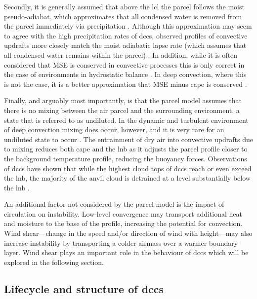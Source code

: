 Secondly, it is generally assumed that above the \acrshort{lcl} the parcel follows the moist pseudo-adiabat, which approximates that all condensed water is removed from the parcel immediately via precipitation \citep{emanuel_atmospheric_1994}. 
Although this approximation may seem to agree with the high precipitation rates of \acrshort{dcc}s, observed profiles of convective updrafts more closely match the moist adiabatic lapse rate (which assumes that all condensed water remains within the parcel) \citep{xu_is_1989}. 
In addition, while it is often considered that MSE is conserved in convective processes this is only correct in the case of environments in hydrostatic balance \citep{peters_evaluating_2021}. 
In deep convection, where this is not the case, it is a better approximation that MSE minus \acrshort{cape} is conserved \citep{romps_mse_2015}.

Finally, and arguably most importantly, is that the parcel model assumes that there is no mixing between the air parcel and the surrounding environment, a state that is referred to as undiluted. 
In the dynamic and turbulent environment of deep convection mixing does occur, however, and it is very rare for an undiluted state to occur \citep{zipser_cumulonimbus_1980, romps_undiluted_2010}. 
The entrainment of dry air into convective updrafts due to mixing reduces both \acrshort{cape} \citep{zhang_effects_2009} and the \acrshort{lnb} \citep{masunaga_convective_2016} as it adjusts the parcel profile closer to the background temperature profile, reducing the buoyancy forces. 
Observations of \acrshort{dcc}s have shown that while the highest cloud tops of \acrshort{dcc}s reach or even exceed the \acrshort{lnb}, the majority of the anvil cloud is detrained at a level substantially below the \acrshort{lnb} \citep{takahashi_where_2012, takahashi_level_2017}.

An additional factor not considered by the parcel model is the impact of circulation on instability.
Low-level convergence may transport additional heat and moisture to the base of the profile, increasing the potential for convection.
Wind shear---change in the speed and/or direction of wind with height---may also increase instability by transporting a colder airmass over a warmer boundary layer.
Wind shear plays an important role in the behaviour of \acrshort{dcc}s which will be explored in the following section.


\subsection{Lifecycle and structure of \acrshort{dcc}s}

